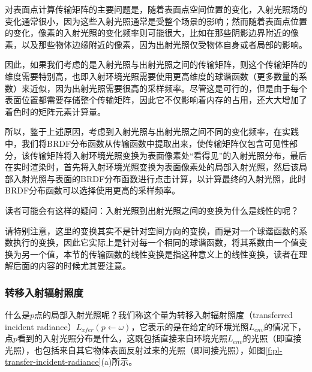 对表面点计算传输矩阵的主要问题是，随着表面点空间位置的变化，入射光照场的变化通常很小，因为这些入射光照通常是受整个场景的影响；然而随着表面点位置的变化，像素的入射光照的变化频率则可能很大，比如在那些阴影边界附近的像素，以及那些物体边缘附近的像素，因为出射光照仅受物体自身或者局部的影响。

因此，如果我们考虑的是入射光照与出射光照之间的传输矩阵，则这个传输矩阵的维度需要特别高，也即入射环境光照需要使用更高维度的球谐函数（更多数量的系数）来近似，因为出射光照需要很高的采样频率。尽管这是可行的，但是由于每个表面位置都需要存储整个传输矩阵，因此它不仅影响着内存的占用，还大大增加了着色时的矩阵元素计算量。

所以，鉴于上述原因，考虑到入射光照与出射光照之间不同的变化频率，在实践中，我们将BRDF分布函数从传输函数中提取出来，使传输矩阵仅包含可见性部分，该传输矩阵将入射环境光照变换为表面像素处“看得见”的入射光照分布，最后在实时渲染时，首先将入射环境光照变换为表面像素处的局部入射光照，然后该局部入射光照与表面的BRDF分布函数进行点击计算，以计算最终的入射光照，此时BRDF分布函数可以选择使用更高的采样频率。

\begin{myshaded}
	读者可能会有这样的疑问：入射光照到出射光照之间的变换为什么是线性的呢？
	
	请特别注意，这里的变换其实不是针对空间方向的变换，而是对一个球谐函数的系数执行的变换，因此它实际上是针对每一个相同的球谐函数，将其系数由一个值变换为另一个值，本节的传输函数的线性变换是指这种意义上的线性变换，读者在理解后面的内容的时候尤其要注意。
\end{myshaded}




\subsubsection{转移入射辐射照度}
什么是$p$点的局部入射光照呢？我们称这个量为转移入射辐射照度（transferred incident radiance）$L_{xfer}(p\leftarrow \omega)$，它表示的是在给定的环境光照$L_{env}$的情况下，点$p$看到的入射光照分布是什么，这既包括直接来自环境光照$L_{env}$的光照（即直接光照），也包括来自其它物体表面反射过来的光照（即间接光照），如图\ref{f:pl-transfer-incident-radiance}(a)所示。

